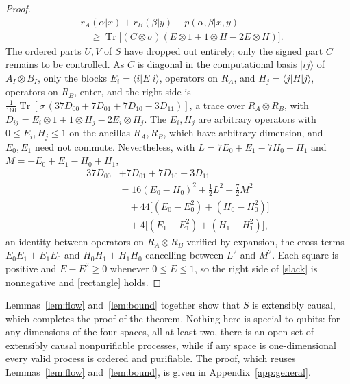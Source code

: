 \documentclass[aps,prl,reprint,superscriptaddress,nofootinbib,longbibliography,raggedbottom]{revtex4-2}
\DeclareMathOperator{\Tr}{Tr}
\newcommand{\ket}[1]{\lvert #1\rangle}
\newcommand{\bra}[1]{\langle #1\rvert}
\begin{document}
\begin{proof}
\begin{equation}
\begin{split}
&r_A(\alpha|x)+r_B(\beta|y)-p(\alpha,\beta|x,y)\\
&\quad\geq\Tr\bigl[(C\otimes\sigma)(E\otimes1+1\otimes H-2E\otimes H)\bigr].
\end{split}
\end{equation}
The ordered parts $U,V$ of $S$ have dropped out entirely; only the signed
part $C$ remains to be controlled.
As $C$ is diagonal in the computational basis $\ket{ij}$ of $A_I\otimes B_I$,
only the blocks $E_i=\bra iE\ket i$, operators on $R_A$, and
$H_j=\bra jH\ket j$, operators on $R_B$, enter, and the right side is
$\tfrac1{160}\Tr[\sigma\,(37D_{00}+7D_{01}+7D_{10}-3D_{11})]$, a trace
over $R_A\otimes R_B$, with
$D_{ij}=E_i\otimes1+1\otimes H_j-2E_i\otimes H_j$. The $E_i,H_j$ are
arbitrary operators with $0\leq E_i,H_j\leq1$ on the ancillas $R_A,R_B$,
which have arbitrary dimension, and $E_0,E_1$ need not commute.
Nevertheless, with $L=7E_0+E_1-7H_0-H_1$ and $M=-E_0+E_1-H_0+H_1$,
\begin{equation}\label{SOS}
\begin{split}
37D_{00}&+7D_{01}+7D_{10}-3D_{11}\\
&=16(E_0-H_0)^2+\tfrac12L^2+\tfrac72M^2\\
&\quad+44\bigl[(E_0-E_0^2)+(H_0-H_0^2)\bigr]\\
&\quad+4\bigl[(E_1-E_1^2)+(H_1-H_1^2)\bigr],
\end{split}
\end{equation}
an identity between operators on $R_A\otimes R_B$ verified by expansion,
the cross terms $E_0E_1+E_1E_0$ and $H_0H_1+H_1H_0$ cancelling between
$L^2$ and $M^2$. Each square is positive and $E-E^2\geq0$ whenever
$0\leq E\leq1$, so the right side of \eqref{slack} is nonnegative and
\eqref{rectangle} holds.
\end{proof}

Lemmas~\ref{lem:flow} and~\ref{lem:bound} together show that $S$ is
extensibly causal, which completes the proof of the theorem. Nothing here is special to qubits: for any dimensions of the four spaces,
all at least two, there is an open set of extensibly causal nonpurifiable
processes, while if any space is one-dimensional every valid process is
ordered and purifiable. The proof, which reuses Lemmas~\ref{lem:flow} and~\ref{lem:bound}, is given in
Appendix~\ref{app:general}.

\medskip
\end{document}
